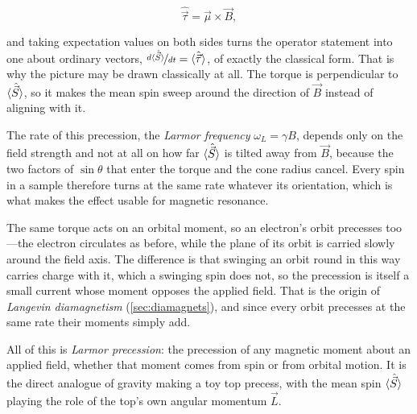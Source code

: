         \begin{equation*}
            \hat{\vec{\tau}} = \hat{\vec{\mu}}\times \vec{B},
        \end{equation*}

        and taking expectation values on both sides turns the operator statement into one about ordinary vectors, $\nicefrac{d\langle \hat{\vec{S}} \rangle}{dt} = \langle \hat{\vec{\tau}} \rangle$, of exactly the classical form. That is why the picture may be drawn classically at all. The torque is perpendicular to $\langle \hat{\vec{S}} \rangle$, so it makes the mean spin sweep around the direction of $\vec{B}$ instead of aligning with it.

        The rate of this precession, the \emph{Larmor frequency} $\omega_{L} = \gamma B$, depends only on the field strength and not at all on how far $\langle \hat{\vec{S}} \rangle$ is tilted away from $\vec{B}$, because the two factors of $\sin\theta$ that enter the torque and the cone radius cancel. Every spin in a sample therefore turns at the same rate whatever its orientation, which is what makes the effect usable for magnetic resonance.
        
        The same torque acts on an orbital moment, so an electron's orbit precesses too---the electron circulates as before, while the plane of its orbit is carried slowly around the field axis. The difference is that swinging an orbit round in this way carries charge with it, which a swinging spin does not, so the precession is itself a small current whose moment opposes the applied field. That is the origin of \emph{Langevin diamagnetism} (\cref{sec:diamagnets}), and since every orbit precesses at the same rate their moments simply add.

        All of this is \emph{Larmor precession}: the precession of any magnetic moment about an applied field, whether that moment comes from spin or from orbital motion. It is the direct analogue of gravity making a toy top precess, with the mean spin $\langle \hat{\vec{S}} \rangle$ playing the role of the top's own angular momentum $\vec{L}$.


